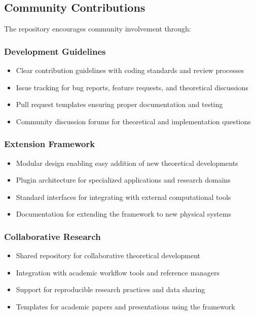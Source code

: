 \subsection{Community Contributions}
\label{subsec:community_contributions}

The repository encourages community involvement through:

\subsubsection{Development Guidelines}

\begin{itemize}
\item Clear contribution guidelines with coding standards and review processes
\item Issue tracking for bug reports, feature requests, and theoretical discussions
\item Pull request templates ensuring proper documentation and testing
\item Community discussion forums for theoretical and implementation questions
\end{itemize}

\subsubsection{Extension Framework}

\begin{itemize}
\item Modular design enabling easy addition of new theoretical developments
\item Plugin architecture for specialized applications and research domains
\item Standard interfaces for integrating with external computational tools
\item Documentation for extending the framework to new physical systems
\end{itemize}

\subsubsection{Collaborative Research}

\begin{itemize}
\item Shared repository for collaborative theoretical development
\item Integration with academic workflow tools and reference managers
\item Support for reproducible research practices and data sharing
\item Templates for academic papers and presentations using the framework
\end{itemize}


